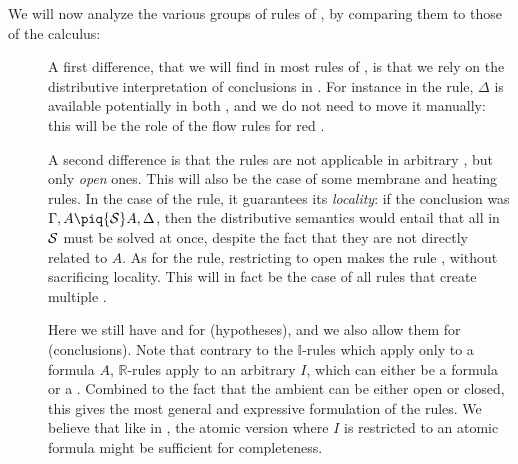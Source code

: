 We will now analyze the various groups of rules of , by
comparing them to those of the  calculus:
\begin{description}
  \item[\textbf{\identity}] 
  A first difference, that we will find in most rules of , is that
  we rely on the distributive interpretation of conclusions in . For
  instance in the  rule, $\Delta$ is available potentially in
  both , and we do not need to move it manually: this will be the role
  of the flow rules for red .
  
  A second difference is that the rules are not applicable in arbitrary
  , but only \emph{open} ones. This will also be the case of some
  membrane and heating rules. In the case of the  rule, it
  guarantees its \emph{locality}: if the conclusion was $\Gamma, A \piq{\cS} A,
  \Delta$, then the distributive semantics would entail that all  in
  $\mathcal{S}$ must be solved at once, despite the fact that they are not directly
  related to $A$. As for the
   rule, restricting to open  makes the rule
  \emph{}, without sacrificing locality. This will in fact be the case
  of all rules that create multiple .

  \item[\textbf{\resource}] 
  Here we still have  and  for   (hypotheses),
  and we also allow them for   (conclusions). Note that contrary to
  the $\mathbb{I}$-rules which apply only to a formula $A$, $\mathbb{R}$-rules
  apply to an arbitrary  $I$, which can either be a formula or a .
  Combined to the fact that the ambient  can be either open or closed,
  this gives the most general and expressive formulation of the rules. We
  believe that like in , the atomic version where $I$ is restricted to an
  atomic formula might be sufficient for completeness.

  \item[\textbf{\flow}]


\end{description}
